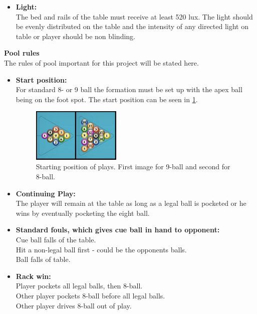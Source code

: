 \begin{itemize}
		
	\item \textbf{Light:}\\
		The bed and rails of the table must receive at least 520 lux. The light should be evenly distributed on the table and the intensity of any directed light on table or player should be non blinding.
\end{itemize}

\textbf{Pool rules}\\
The rules of pool important for this project will be stated here.

\begin{itemize}
	\item \textbf{Start position:}\\
		For standard 8- or 9 ball the formation must be set up with the apex ball being on the foot spot. The start position can be seen in \ref{fig:poolstart}.\\
		
\begin{figure}[H]
\begin{center}
\leavevmode
\includegraphics[width=0.4\textwidth]{images/poolstart.jpg}
\end{center}
\caption{Starting position of plays. First image for 9-ball and second for 8-ball.}
\label{fig:poolstart}
\end{figure}

	\item \textbf{Continuing Play:}\\
		The player will remain at the table as long as a legal ball is pocketed or he wins by eventually pocketing the eight ball.\\
		
	\item \textbf{Standard fouls, which gives cue ball in hand to opponent:}\\
		Cue ball falls of the table.\\
		Hit a non-legal ball first - could be the opponents balls.\\
		Ball falls of table.\\
		
	\item \textbf{Rack win:}\\
		Player pockets all legal balls, then 8-ball.\\
		Other player pockets 8-ball before all legal balls.\\
		Other player drives 8-ball out of play.\\
\end{itemize}

